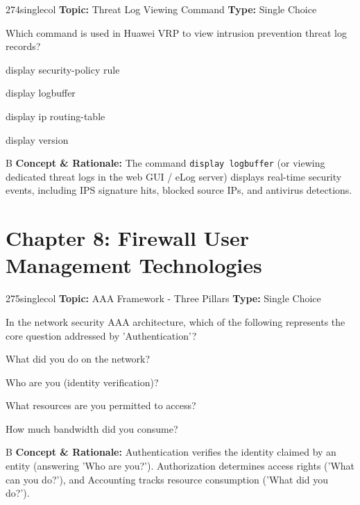 \begin{qcard}{274}{singlecol}
\textcolor{darkslate!75}{\small\textbf{Topic:} Threat Log Viewing Command \hfill \textbf{Type:} Single Choice}\vspace{0.4em}\par
Which command is used in Huawei VRP to view intrusion prevention threat log records?
\begin{qoptions}
\item display security-policy rule
\item display logbuffer
\item display ip routing-table
\item display version
\end{qoptions}
\end{qcard}
\nopagebreak
\begin{explainbox}{B}
\textbf{Concept \& Rationale:} The command \texttt{display logbuffer} (or viewing dedicated threat logs in the web GUI / eLog server) displays real-time security events, including IPS signature hits, blocked source IPs, and antivirus detections.
\end{explainbox}

\section{Chapter 8: Firewall User Management Technologies}

\begin{qcard}{275}{singlecol}
\textcolor{darkslate!75}{\small\textbf{Topic:} AAA Framework - Three Pillars \hfill \textbf{Type:} Single Choice}\vspace{0.4em}\par
In the network security AAA architecture, which of the following represents the core question addressed by 'Authentication'?
\begin{qoptions}
\item What did you do on the network?
\item Who are you (identity verification)?
\item What resources are you permitted to access?
\item How much bandwidth did you consume?
\end{qoptions}
\end{qcard}
\nopagebreak
\begin{explainbox}{B}
\textbf{Concept \& Rationale:} Authentication verifies the identity claimed by an entity (answering 'Who are you?'). Authorization determines access rights ('What can you do?'), and Accounting tracks resource consumption ('What did you do?').
\end{explainbox}

